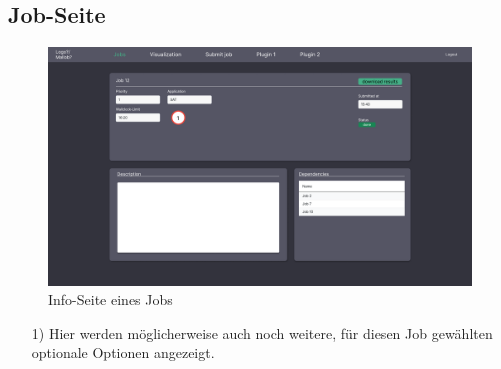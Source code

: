 \subsection{Job-Seite}
\label{pages:job-page}
\begin{figure}[H]
    \centering
    \includegraphics[width=\textwidth]{images-interface/v3_interface/job_info_page_v3.pdf}
    \caption{Info-Seite eines Jobs}
    \label{fig:job-page}
\end{figure}
\begin{itemize}
    \item[1)] Hier werden möglicherweise auch noch weitere, für diesen Job gewählten optionale Optionen angezeigt.
\end{itemize}

\newpage
